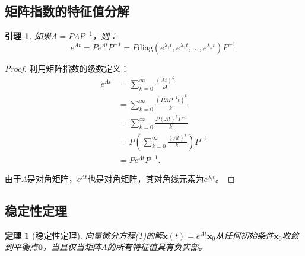 \documentclass[12pt,a4paper]{article}
\newtheorem{theorem}{定理}
\newtheorem{lemma}{引理}
\newtheorem{proof}{证明}
\begin{document}
\subsection{矩阵指数的特征值分解}

\begin{lemma}
如果$A = P\Lambda P^{-1}$，则：
\begin{equation}
e^{At} = Pe^{\Lambda t}P^{-1} = P\text{diag}(e^{\lambda_1 t}, e^{\lambda_2 t}, \ldots, e^{\lambda_n t})P^{-1}.
\end{equation}
\end{lemma}

\begin{proof}
利用矩阵指数的级数定义：
\begin{align}
e^{At} &= \sum_{k=0}^{\infty} \frac{(At)^k}{k!} \\
&= \sum_{k=0}^{\infty} \frac{(P\Lambda P^{-1}t)^k}{k!} \\
&= \sum_{k=0}^{\infty} \frac{P(\Lambda t)^k P^{-1}}{k!} \\
&= P\left(\sum_{k=0}^{\infty} \frac{(\Lambda t)^k}{k!}\right)P^{-1} \\
&= Pe^{\Lambda t}P^{-1}.
\end{align}

由于$\Lambda$是对角矩阵，$e^{\Lambda t}$也是对角矩阵，其对角线元素为$e^{\lambda_i t}$。
\end{proof}

\subsection{稳定性定理}

\begin{theorem}[稳定性定理]
向量微分方程(1)的解$\mathbf{x}(t) = e^{At}\mathbf{x}_0$从任何初始条件$\mathbf{x}_0$收敛到平衡点$\mathbf{0}$，当且仅当矩阵$A$的所有特征值具有负实部。
\end{theorem}
\end{document}
